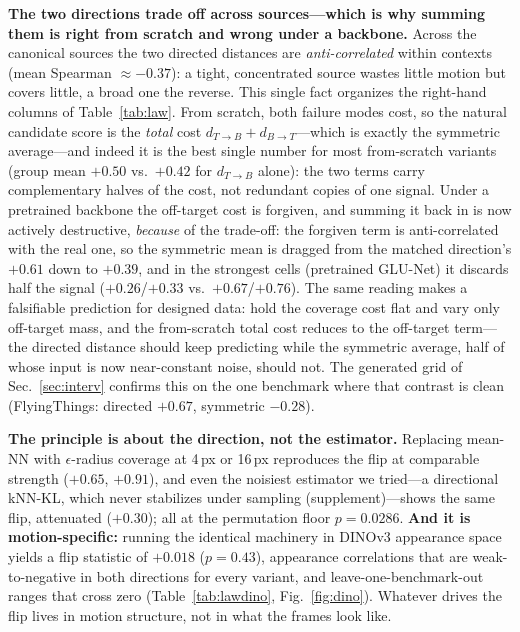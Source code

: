 \documentclass[runningheads]{llncs}
\newcommand{\dtb}{d_{T\to B}}
\newcommand{\dbt}{d_{B\to T}}
\begin{document}
\noindent\textbf{The two directions trade off across sources---which is why
summing them is right from scratch and wrong under a backbone.}
Across the canonical sources the two directed distances are
\emph{anti-correlated} within contexts (mean Spearman $\approx{-}0.37$): a
tight, concentrated source wastes little motion but covers little, a broad
one the reverse. This single fact organizes the right-hand columns of
Table~\ref{tab:law}. From scratch, both failure modes cost, so the natural
candidate score is the \emph{total} cost $\dtb{+}\dbt$---which is exactly the
symmetric average---and indeed it is the best single number for most
from-scratch variants (group mean $+0.50$ vs.\ $+0.42$ for $\dtb$ alone):
the two terms carry complementary halves of the cost, not redundant copies
of one signal. Under a pretrained backbone the off-target cost is forgiven,
and summing it back in is now actively destructive, \emph{because} of the
trade-off: the forgiven term is anti-correlated with the real one, so the
symmetric mean is dragged from the matched direction's $+0.61$ down to
$+0.39$, and in the strongest cells (pretrained GLU-Net) it discards half
the signal ($+0.26$/$+0.33$ vs.\ $+0.67$/$+0.76$). The same reading makes a
falsifiable prediction for designed data: hold the coverage cost flat and
vary only off-target mass, and the from-scratch total cost reduces to the
off-target term---the directed distance should keep predicting while the
symmetric average, half of whose input is now near-constant noise, should
not. The generated grid of Sec.~\ref{sec:interv} confirms this on the one
benchmark where that contrast is clean (FlyingThings: directed $+0.67$,
symmetric $-0.28$).

\noindent\textbf{The principle is about the direction, not the estimator.}
Replacing mean-NN with $\epsilon$-radius coverage at 4\,px or 16\,px
reproduces the flip at comparable strength ($+0.65$, $+0.91$), and even the
noisiest estimator we tried---a directional kNN-KL, which never stabilizes
under sampling (supplement)---shows the same flip, attenuated ($+0.30$); all
at the permutation floor $p{=}0.0286$. \textbf{And it is motion-specific:} running the
identical machinery in DINOv3 appearance space yields a flip statistic of
$+0.018$ ($p{=}0.43$), appearance correlations that are weak-to-negative in
both directions for every variant, and leave-one-benchmark-out ranges that
cross zero (Table~\ref{tab:lawdino}, Fig.~\ref{fig:dino}). Whatever drives
the flip lives in motion structure, not in what the frames look like.
\end{document}

